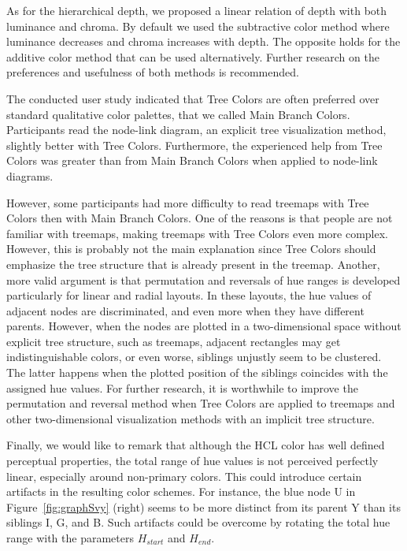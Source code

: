 \documentclass[review,journal]{vgtc}         %
\begin{document}
As for the hierarchical depth, we proposed a linear relation of depth with both luminance and chroma. By default we used the subtractive color method where luminance decreases and chroma increases with depth. The opposite holds for the additive color method that can be used alternatively. Further research on the preferences and usefulness of both methods is recommended.

The conducted user study indicated that Tree Colors are often preferred over standard qualitative color palettes, that we called Main Branch Colors. Participants read the node-link diagram, an explicit tree visualization method, slightly better with Tree Colors. Furthermore, the experienced help from Tree Colors was greater than from Main Branch Colors when applied to node-link diagrams. 

However, some participants had more difficulty to read treemaps with Tree Colors then with Main Branch Colors. One of the reasons is that people are not familiar with treemaps, making treemaps with Tree Colors even more complex. However, this is probably not the main explanation since Tree Colors should emphasize the tree structure that is already present in the treemap. Another, more valid argument is that permutation and reversals of hue ranges is developed particularly for linear and radial layouts. In these layouts, the hue values of adjacent nodes are discriminated, and even more when they have different parents. However, when the nodes are plotted in a two-dimensional space without explicit tree structure, such as treemaps, adjacent rectangles may get indistinguishable colors, or even worse, siblings unjustly seem to be clustered. The latter happens when the plotted position of the siblings coincides with the assigned hue values. For further research, it is worthwhile to improve the permutation and reversal method when Tree Colors are applied to treemaps and other two-dimensional visualization methods with an implicit tree structure.

Finally, we would like to remark that although the HCL color has well defined perceptual properties, the total range of hue values is not perceived perfectly linear, especially around non-primary colors. This could introduce certain artifacts in the resulting color schemes. For instance, the blue node U in Figure~\ref{fig:graphSvy} (right) seems to be more distinct from its parent Y than its siblings I, G, and B. Such artifacts could be overcome by rotating the total hue range with the parameters $H_{start}$ and $H_{end}$.





\end{document}
